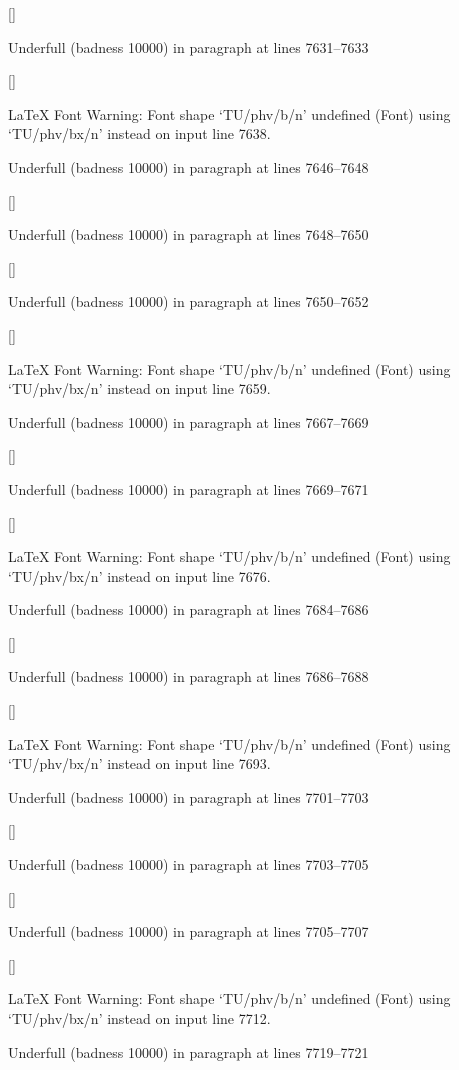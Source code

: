  []


Underfull \hbox (badness 10000) in paragraph at lines 7631--7633

 []


LaTeX Font Warning: Font shape `TU/phv/b/n' undefined
(Font)              using `TU/phv/bx/n' instead on input line 7638.


Underfull \hbox (badness 10000) in paragraph at lines 7646--7648

 []


Underfull \hbox (badness 10000) in paragraph at lines 7648--7650

 []


Underfull \hbox (badness 10000) in paragraph at lines 7650--7652

 []


LaTeX Font Warning: Font shape `TU/phv/b/n' undefined
(Font)              using `TU/phv/bx/n' instead on input line 7659.


Underfull \hbox (badness 10000) in paragraph at lines 7667--7669

 []


Underfull \hbox (badness 10000) in paragraph at lines 7669--7671

 []


LaTeX Font Warning: Font shape `TU/phv/b/n' undefined
(Font)              using `TU/phv/bx/n' instead on input line 7676.


Underfull \hbox (badness 10000) in paragraph at lines 7684--7686

 []


Underfull \hbox (badness 10000) in paragraph at lines 7686--7688

 []


LaTeX Font Warning: Font shape `TU/phv/b/n' undefined
(Font)              using `TU/phv/bx/n' instead on input line 7693.


Underfull \hbox (badness 10000) in paragraph at lines 7701--7703

 []


Underfull \hbox (badness 10000) in paragraph at lines 7703--7705

 []


Underfull \hbox (badness 10000) in paragraph at lines 7705--7707

 []


LaTeX Font Warning: Font shape `TU/phv/b/n' undefined
(Font)              using `TU/phv/bx/n' instead on input line 7712.


Underfull \hbox (badness 10000) in paragraph at lines 7719--7721

